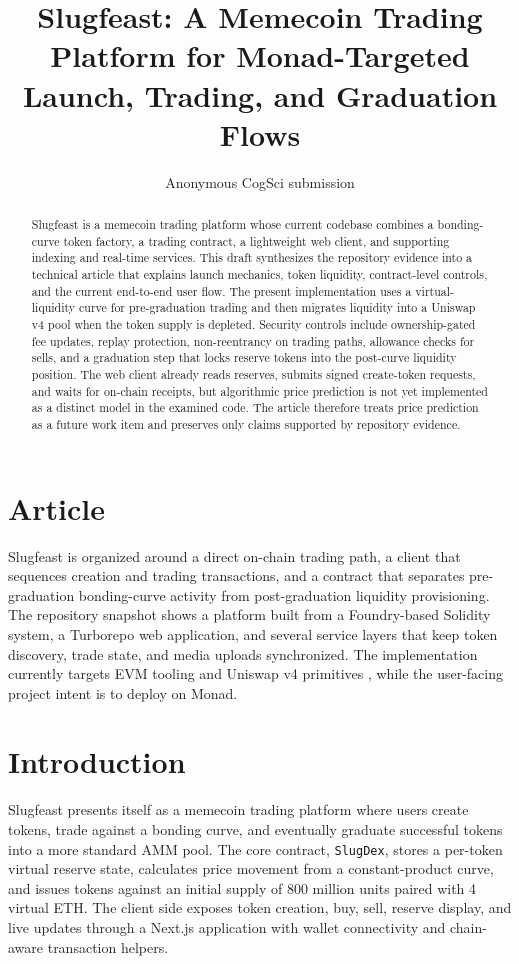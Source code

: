 \documentclass[10pt,letterpaper]{article}
\title{Slugfeast: A Memecoin Trading Platform for Monad-Targeted Launch, Trading, and Graduation Flows}
\author{Anonymous CogSci submission}
\begin{document}
\maketitle

\begin{abstract}
Slugfeast is a memecoin trading platform whose current codebase combines a bonding-curve token factory, a trading contract, a lightweight web client, and supporting indexing and real-time services. This draft synthesizes the repository evidence into a technical article that explains launch mechanics, token liquidity, contract-level controls, and the current end-to-end user flow. The present implementation uses a virtual-liquidity curve for pre-graduation trading and then migrates liquidity into a Uniswap v4 pool when the token supply is depleted. Security controls include ownership-gated fee updates, replay protection, non-reentrancy on trading paths, allowance checks for sells, and a graduation step that locks reserve tokens into the post-curve liquidity position. The web client already reads reserves, submits signed create-token requests, and waits for on-chain receipts, but algorithmic price prediction is not yet implemented as a distinct model in the examined code. The article therefore treats price prediction as a future work item and preserves only claims supported by repository evidence.
\end{abstract}

\section{Article}
Slugfeast is organized around a direct on-chain trading path, a client that sequences creation and trading transactions, and a contract that separates pre-graduation bonding-curve activity from post-graduation liquidity provisioning. The repository snapshot shows a platform built from a Foundry-based Solidity system, a Turborepo web application, and several service layers that keep token discovery, trade state, and media uploads synchronized. The implementation currently targets EVM tooling and Uniswap v4 primitives \citep{FoundryDocs, UniswapV4Docs}, while the user-facing project intent is to deploy on Monad.

\section{Introduction}
Slugfeast presents itself as a memecoin trading platform where users create tokens, trade against a bonding curve, and eventually graduate successful tokens into a more standard AMM pool. The core contract, \texttt{SlugDex}, stores a per-token virtual reserve state, calculates price movement from a constant-product curve, and issues tokens against an initial supply of 800 million units paired with 4 virtual ETH. The client side exposes token creation, buy, sell, reserve display, and live updates through a Next.js application with wallet connectivity and chain-aware transaction helpers.
\end{document}
